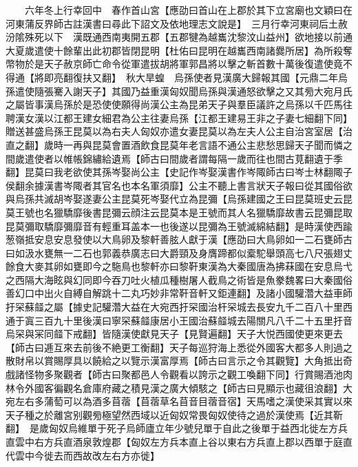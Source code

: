 　　六年冬上行幸回中　春作首山宮【應劭曰首山在上郡於其下立宮廟也文穎曰在河東蒲反界師古註漢書曰尋此下詔文及依地理志文說是】　三月行幸河東祠后土赦汾隂殊死以下　漢既通西南夷開五郡【五郡犍為越巂沈黎汶山益州】欲地接以前通大夏歲遣使十餘輩出此初郡皆閉昆明【杜佑曰昆明在越巂西南諸爨所居】為所殺奪幣物於是天子赦京師亡命令從軍遣拔胡將軍郭昌將以擊之斬首數十萬後復遣使竟不得通【將即亮翻復扶又翻】　秋大旱蝗　烏孫使者見漢廣大歸報其國【元鼎二年烏孫遣使隨張騫入謝天子】其國乃益重漢匈奴聞烏孫與漢通怒欲擊之又其㫄大宛月氏之屬皆事漢烏孫於是恐使使願得尚漢公主為昆弟天子與羣臣議許之烏孫以千匹馬往聘漢女漢以江都王建女細君為公主往妻烏孫【江都王建易王非之子妻七細翻下同】贈送甚盛烏孫王昆莫以為右夫人匈奴亦遣女妻昆莫以為左夫人公主自治宮室居【治直之翻】歲時一再與昆莫會置酒飲食昆莫年老言語不通公主悲愁思歸天子聞而憐之間歲遣使者以帷帳錦繡給遺焉【師古曰間歲者謂每隔一歲而往也間古莧翻遺于季翻】昆莫曰我老欲使其孫岑娶尚公主【史記作岑娶漢書作岑陬師古曰岑士林翻陬子侯翻余據漢書岑陬者其官名也本名軍須靡】公主不聽上書言狀天子報曰從其國俗欲與烏孫共滅胡岑娶遂妻公主昆莫死岑娶代立為昆彌【烏孫建國之王曰昆莫班史云昆莫王號也名獵驕靡後書昆彌云顔注云昆莫本是王號而其人名獵驕靡故書云昆彌昆取昆莫彌取驕靡彌靡音有輕重耳盖本一也後遂以昆彌為王號滅綿結翻】是時漢使西踰葱嶺抵安息安息發使以大鳥卵及黎軒善胘人獻于漢【應劭曰大鳥卵如一二石甕師古曰如汲水甕無一二石也郭義恭廣志曰大爵頸及身膺蹄都似槖駝舉頭高七八尺張翅丈餘食大麥其卵如甕即今之駞鳥也黎軒亦曰黎靬東漢為大秦國唐為拂菻國在安息烏弋之西隔大海眩與幻同即今吞刀吐火植瓜種樹屠人截鳥之術皆是魚豢魏畧曰大秦國俗善幻口中出火自縛自解跳十二丸巧妙非常靬音軒又鉅連翻】及諸小國驩濳大益車師扜罙蘇䪥之屬【據史記驩濳大益在大宛西扜罙國治杆罙城去長安九千二百八十里西通于寘三百九十里後漢曰寧罙蘇䪥康居小王國治蘇䪥城去陽關凡八千二十五里扜音烏罙與冞同䪥下戒翻】皆隨漢使獻見天子【見賢遍翻】天子大悦西國使更來更去【師古曰逓互來去前後不絶更工衡翻】天子每巡狩海上悉從外國客大都多人則過之散財帛以賞賜厚具以饒給之以覽示漢富厚焉【師古曰言示之令其觀覽】大角抵出奇戲諸怪物多聚觀者【師古曰聚都邑人令觀看以誇示之觀工喚翻下同】行賞賜酒池肉林令外國客徧觀名倉庫府藏之積見漢之廣大傾駭之【師古曰見顯示也藏徂浪翻】大宛左右多蒲萄可以為酒多苜蓿【苜蓿草名苜音目蓿音宿】天馬嗜之漢使采其實以來天子種之於離宮别觀㫄極望然西域以近匈奴常畏匈奴使待之過於漢使焉【近其靳翻】　是歲匈奴烏維單于死子烏師廬立年少號兒單于自此之後單于益西北徙左方兵直雲中右方兵直酒泉敦煌郡【匈奴左方兵本直上谷以東右方兵直上郡以西單于庭直代雲中今徙去而西故改左右方亦徙】

